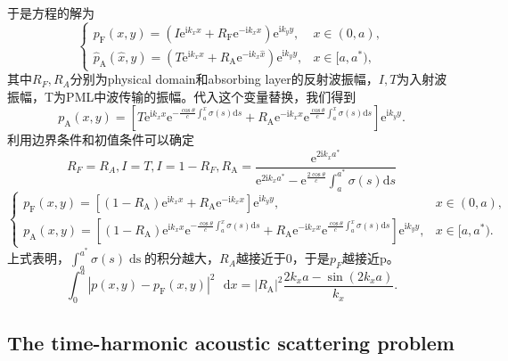 \documentclass{article}
\newcommand{\tmop}[1]{\ensuremath{\operatorname{#1}}}
\begin{document}
\begin{CJK*}{UTF8}{gbsn}
于是方程的解为
\[ \left\{ \begin{array}{ll}
     p_{\mathrm{F}} (x, y) = (I \mathrm{e}^{\mathrm{i} k_x x} + R_{\mathrm{F}}
     \mathrm{e}^{- \mathrm{i} k_x x}) \mathrm{e}^{\mathrm{i} k_y y}, & x \in
     (0, a),\\
     \hat{p}_{\mathrm{A}} (\hat{x}, y) = (T \mathrm{e}^{\mathrm{i} k_x 
     \hat{x}} + R_{\mathrm{A}} \mathrm{e}^{- \mathrm{i} k_x  \hat{x}})
     \mathrm{e}^{\mathrm{i} k_y y}, & x \in [a, a^{\ast}),
   \end{array} \right. \]
其中$R_F, R_A$分别为physical domain和absorbing
layer的反射波振幅，$I,
T$为入射波振幅，T为PML中波传输的振幅。代入这个变量替换，我们得到
\[ p_{\mathrm{A}} (x, y) = \left[ T \mathrm{e}^{\mathrm{i} k_x x}
   \mathrm{e}^{- \frac{\cos \theta}{c}  \int_a^x \sigma (s) \mathrm{d} s} +
   R_{\mathrm{A}} \mathrm{e}^{- \mathrm{i} k_x x} \mathrm{e}^{\frac{\cos
   \theta}{c}  \int_a^x \sigma (s) \mathrm{d} s} \right]
   \mathrm{e}^{\mathrm{i} k_y y} . \]
利用边界条件和初值条件可以确定
\[ R_F = R_A, I = T, I = 1 - R_F, R_{\mathrm{A}} = \frac{\mathrm{e}^{2
   \mathrm{i} k_x a^{\ast}}}{\mathrm{e}^{2 \mathrm{i} k_x a^{\ast}} -
   \mathrm{e}^{\frac{2 \cos \theta}{c}} \int_a^{a^{\ast}} \sigma (s)
   \mathrm{d} s} \]
\[ \left\{ \begin{array}{ll}
     p_{\mathrm{F}} (x, y) = [(1 - R_{\mathrm{A}}) \mathrm{e}^{\mathrm{i} k_x
     x} + R_{\mathrm{A}} \mathrm{e}^{- \mathrm{i} k_x x}]
     \mathrm{e}^{\mathrm{i} k_y y}, & x \in (0, a),\\
     p_{\mathrm{A}} (x, y) = \left[ (1 - R_{\mathrm{A}})
     \mathrm{e}^{\mathrm{i} k_x x} \mathrm{e}^{- \frac{\cos \theta}{c} 
     \int_a^x \sigma (s) \mathrm{d} s} + R_{\mathrm{A}} \mathrm{e}^{-
     \mathrm{i} k_x x} \mathrm{e}^{\frac{\cos \theta}{c}  \int_a^x \sigma (s)
     \mathrm{d} s} \right] \mathrm{e}^{\mathrm{i} k_y y}, & x \in [a,
     a^{\ast}) .
   \end{array} \right. \]
上式表明，$\int_a^{a^{\ast}} \sigma (s)
\tmop{ds}$的积分越大，$R_A$越接近于0，于是$p_F$越接近p。
\[ \int_0^a | p (x, y) - p_{\mathrm{F}} (x, y) |^2 \textrm{~ d} x = |
   R_{\mathrm{A}} |^2 \frac{2 k_x a - \sin (2 k_x a)}{k_x} . \]

\subsection{The time-harmonic acoustic scattering problem}


\end{CJK*}
\end{document}

